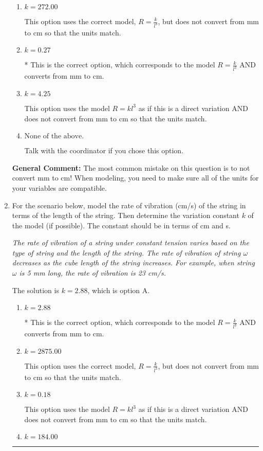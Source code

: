 \documentclass{extbook}[14pt]
\newcommand{\litem}[1]{\item #1

\rule{\textwidth}{0.4pt}}
\begin{document}
\begin{enumerate}
{\begin{enumerate}[label=\Alph*.]
This option uses the model $R = kl^{3}$ as if this is a direct variation.
\item \( k = 272.00 \)

This option uses the correct model, $R = \frac{k}{l^{3}}$, but does not convert from mm to cm so that the units match.
\item \( k = 0.27 \)

* This is the correct option, which corresponds to the model $R = \frac{k}{l^{3}}$ AND converts from mm to cm.
\item \( k = 4.25 \)

This option uses the model $R = kl^{3}$ as if this is a direct variation AND does not convert from mm to cm so that the units match.
\item \( \text{None of the above.} \)

Talk with the coordinator if you chose this option.
\end{enumerate}

\textbf{General Comment:} The most common mistake on this question is to not convert mm to cm! When modeling, you need to make sure all of the units for your variables are compatible.
}
\litem{
For the scenario below, model the rate of vibration (cm/s) of the string in terms of the length of the string. Then determine the variation constant $k$ of the model (if possible). The constant should be in terms of cm and s.

\begin{center}
    \textit{ The rate of vibration of a string under constant tension varies based on the type of string and the length of the string. The rate of vibration of string $\omega$ decreases as the cube length of the string increases. For example, when string $\omega$ is 5 mm long, the rate of vibration is 23 cm/s. }
\end{center}
The solution is \( k = 2.88 \), which is option A.\begin{enumerate}[label=\Alph*.]
\item \( k = 2.88 \)

* This is the correct option, which corresponds to the model $R = \frac{k}{l^{3}}$ AND converts from mm to cm.
\item \( k = 2875.00 \)

This option uses the correct model, $R = \frac{k}{l^{3}}$, but does not convert from mm to cm so that the units match.
\item \( k = 0.18 \)

This option uses the model $R = kl^{3}$ as if this is a direct variation AND does not convert from mm to cm so that the units match.
\item \( k = 184.00 \)


\end{enumerate}}
\end{enumerate}
\end{document}
